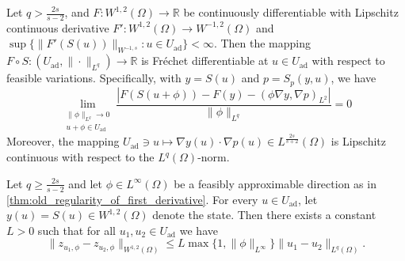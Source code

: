 \documentclass[10pt,a4paper]{amsart}
\newcommand{\R}{\mathbb{R}}
\newcommand{\feas}{U_{\textrm{ad}}}
\begin{document}
\begin{theorem}\label{thm:old_regularity_of_first_derivative}
Let $q > \frac{2s}{s - 2}$, and $F: W^{1,2}(\Omega)\to \R$ be continuously differentiable with  Lipschitz
continuous derivative $F' : W^{1,2}(\Omega) \to W^{-1,2}(\Omega)$ and $\sup\{ \|F'(S(u))\|_{W^{-1,s}} : u \in \feas\} < \infty$.
Then the mapping $F \circ S : (\feas, \|\cdot\|_{L^q}) \to \R$ is 
Fr\'echet differentiable at $u \in \feas$ with respect to feasible variations. Specifically, with $y = S(u)$ and $p = S_p(y, u)$, we have
%
\[ \underset{\substack{\|\phi\|_{L^q} \to 0\\ u+\phi\in\feas}}\lim
\frac{|F(S(u + \phi)) - F(y) - (\phi \nabla y, \nabla p)_{L^2}|}{\|\phi\|_{L^q}} = 0
\]
%
Moreover, the mapping
$
\feas \ni u
\mapsto
\nabla y(u)\cdot \nabla p(u)
\in L^{\frac{2s}{s+2}}(\Omega)
$
is Lipschitz continuous with respect to the $L^q(\Omega)$-norm.
\end{theorem}

\begin{lemma}\label{lem:Sprime_lipschitz}
Let $q\ge \frac{2s}{s-2}$ and let $\phi\in L^\infty(\Omega)$
be a feasibly approximable direction as in
\cref{thm:old_regularity_of_first_derivative}.
For every $u\in \feas$, let $y(u)=S(u)\in W^{1,2}(\Omega)$ denote the state.
Then there exists a constant $L>0$ such that for all
$u_1,u_2\in \feas$ we have
\[
\|z_{u_1,\phi}-z_{u_2,\phi}\|_{W^{1,2}(\Omega)}
\le
L\max\{1,\|\phi\|_{L^\infty}\}
\|u_1-u_2\|_{L^q(\Omega)}.
\]
\end{lemma}
\end{document}
